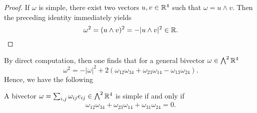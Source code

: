 \begin{proof}
If $\omega$ is simple, there exist two vectors $u, v \in \mathbb{R}^4$ such that $\omega = u \wedge v$. Then the preceding identity immediately yields
\begin{equation}
\omega^2 = (u \wedge v)^2 = -|u \wedge v|^2 \in \mathbb{R}.
\end{equation}
\end{proof}

By direct computation, then one finds that for a general bivector $\omega \in \bigwedge^2 \mathbb{R}^4$
\begin{equation}
\omega^2 = - |\omega|^2 + 2(\omega_{12}\omega_{34} + \omega_{23} \omega_{14} - \omega_{13} \omega_{24}).
\end{equation}
Hence, we have the following

\begin{corollary}
A bivector $\omega = \sum_{i,j} \omega_{ij} e_{ij} \in \bigwedge^2 \mathbb{R}^4$ is simple if and only if
\begin{equation}
\label{eq: general cond simple}
\omega_{12} \omega_{34} + \omega_{23} \omega_{14} +  \omega_{31} \omega_{24} = 0.
\end{equation}
\end{corollary}

